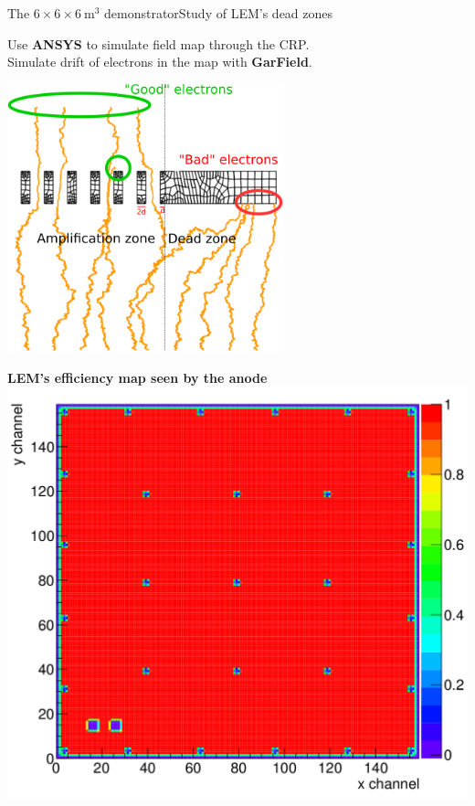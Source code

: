 \documentclass[10pt]{beamer}
\begin{document}
\begin{frame}{The \texorpdfstring{$6 \times 6 \times \SI{6}{\meter\cubed}$}{666} demonstrator}{Study of LEM's dead zones}
\begin{scriptsize}
\begin{minipage}{0.38\textwidth}
    			Use \textbf{ANSYS} to simulate field map through the CRP.\\
    			Simulate drift of electrons in the map with \textbf{GarField}.\\
    		\end{minipage}
    		\begin{minipage}{0.58\textwidth}
    			\centering
    			\includegraphics[width=0.6\textwidth]{figures/666/drift_example.png}\\
    			\vspace{0.5cm} \hspace{0.1cm}
    			\begin{minipage}{0.48\textwidth}
    				\centering
    				\textbf{LEM's efficiency map seen by the anode}\\
    				\includegraphics[width=\textwidth]{figures/666/eff_map.png}

\end{minipage}
\end{minipage}
\end{scriptsize}
\end{frame}
\end{document}
